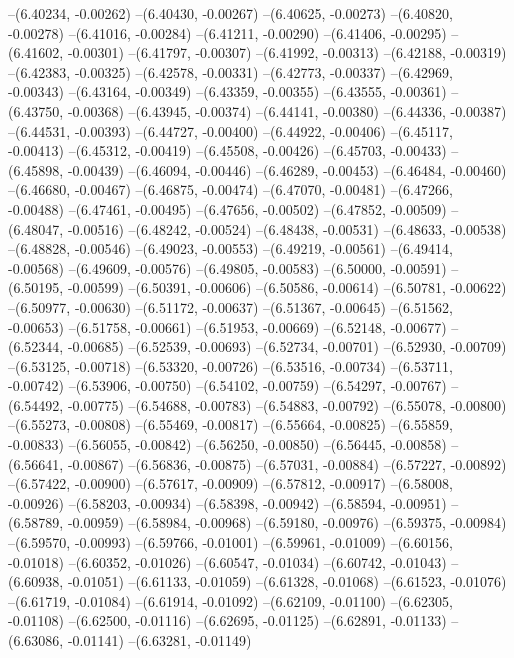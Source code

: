 --(6.40234, -0.00262)
--(6.40430, -0.00267)
--(6.40625, -0.00273)
--(6.40820, -0.00278)
--(6.41016, -0.00284)
--(6.41211, -0.00290)
--(6.41406, -0.00295)
--(6.41602, -0.00301)
--(6.41797, -0.00307)
--(6.41992, -0.00313)
--(6.42188, -0.00319)
--(6.42383, -0.00325)
--(6.42578, -0.00331)
--(6.42773, -0.00337)
--(6.42969, -0.00343)
--(6.43164, -0.00349)
--(6.43359, -0.00355)
--(6.43555, -0.00361)
--(6.43750, -0.00368)
--(6.43945, -0.00374)
--(6.44141, -0.00380)
--(6.44336, -0.00387)
--(6.44531, -0.00393)
--(6.44727, -0.00400)
--(6.44922, -0.00406)
--(6.45117, -0.00413)
--(6.45312, -0.00419)
--(6.45508, -0.00426)
--(6.45703, -0.00433)
--(6.45898, -0.00439)
--(6.46094, -0.00446)
--(6.46289, -0.00453)
--(6.46484, -0.00460)
--(6.46680, -0.00467)
--(6.46875, -0.00474)
--(6.47070, -0.00481)
--(6.47266, -0.00488)
--(6.47461, -0.00495)
--(6.47656, -0.00502)
--(6.47852, -0.00509)
--(6.48047, -0.00516)
--(6.48242, -0.00524)
--(6.48438, -0.00531)
--(6.48633, -0.00538)
--(6.48828, -0.00546)
--(6.49023, -0.00553)
--(6.49219, -0.00561)
--(6.49414, -0.00568)
--(6.49609, -0.00576)
--(6.49805, -0.00583)
--(6.50000, -0.00591)
--(6.50195, -0.00599)
--(6.50391, -0.00606)
--(6.50586, -0.00614)
--(6.50781, -0.00622)
--(6.50977, -0.00630)
--(6.51172, -0.00637)
--(6.51367, -0.00645)
--(6.51562, -0.00653)
--(6.51758, -0.00661)
--(6.51953, -0.00669)
--(6.52148, -0.00677)
--(6.52344, -0.00685)
--(6.52539, -0.00693)
--(6.52734, -0.00701)
--(6.52930, -0.00709)
--(6.53125, -0.00718)
--(6.53320, -0.00726)
--(6.53516, -0.00734)
--(6.53711, -0.00742)
--(6.53906, -0.00750)
--(6.54102, -0.00759)
--(6.54297, -0.00767)
--(6.54492, -0.00775)
--(6.54688, -0.00783)
--(6.54883, -0.00792)
--(6.55078, -0.00800)
--(6.55273, -0.00808)
--(6.55469, -0.00817)
--(6.55664, -0.00825)
--(6.55859, -0.00833)
--(6.56055, -0.00842)
--(6.56250, -0.00850)
--(6.56445, -0.00858)
--(6.56641, -0.00867)
--(6.56836, -0.00875)
--(6.57031, -0.00884)
--(6.57227, -0.00892)
--(6.57422, -0.00900)
--(6.57617, -0.00909)
--(6.57812, -0.00917)
--(6.58008, -0.00926)
--(6.58203, -0.00934)
--(6.58398, -0.00942)
--(6.58594, -0.00951)
--(6.58789, -0.00959)
--(6.58984, -0.00968)
--(6.59180, -0.00976)
--(6.59375, -0.00984)
--(6.59570, -0.00993)
--(6.59766, -0.01001)
--(6.59961, -0.01009)
--(6.60156, -0.01018)
--(6.60352, -0.01026)
--(6.60547, -0.01034)
--(6.60742, -0.01043)
--(6.60938, -0.01051)
--(6.61133, -0.01059)
--(6.61328, -0.01068)
--(6.61523, -0.01076)
--(6.61719, -0.01084)
--(6.61914, -0.01092)
--(6.62109, -0.01100)
--(6.62305, -0.01108)
--(6.62500, -0.01116)
--(6.62695, -0.01125)
--(6.62891, -0.01133)
--(6.63086, -0.01141)
--(6.63281, -0.01149)
